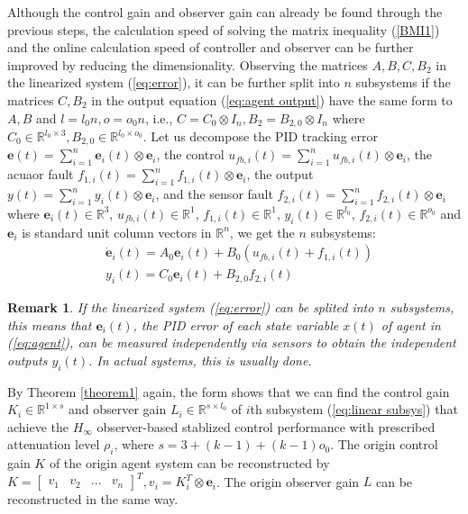 \documentclass{ieeeaccess}
\newtheorem{remark}{Remark}
\begin{document}
Although the control gain and observer gain can already be found through the previous steps, the calculation speed of solving the matrix inequality (\ref{BMI1}) and the online calculation speed of controller and observer can be further improved by reducing the dimensionality. Observing the matrices $A,B,C,B_2$ in the linearized system (\ref{eq:error}), it can be further split into $n$ subsystems if the matrices $C,B_2$ in the output equation (\ref{eq:agent output}) have the same form to $A,B$ and $l=l_0n, o=o_0n$, i.e., $C = C_0\otimes I_n,B_2 = B_{2,0}\otimes I_n$ where $C_0\in\mathbb{R}^{l_0\times 3},B_{2,0}\in\mathbb{R}^{l_0\times o_0}$. Let us decompose the PID tracking error $\pmb{e}(t)=\sum_{i=1}^{n} \pmb{e}_i(t)\otimes\mathbf{e}_i$, the control $u_{fb,i}(t)=\sum_{i=1}^{n} {u}_{fb,i}(t)\otimes\mathbf{e}_i$, the acuaor fault $f_{1,i}(t)=\sum_{i=1}^{n} {f}_{1,i}(t)\otimes\mathbf{e}_i$, the output $y(t)=\sum_{i=1}^{n} {y}_i(t)\otimes\mathbf{e}_i$, and the sensor fault $f_{2,i}(t)=\sum_{i=1}^{n} {f}_{2,i}(t)\otimes\mathbf{e}_i$ where $\pmb{e}_i(t)\in\mathbb{R}^3$, $u_{fb,i}(t)\in\mathbb{R}^1$, $f_{1,i}(t)\in\mathbb{R}^1$, $y_i(t)\in\mathbb{R}^{l_0}$, $f_{2,i}(t)\in\mathbb{R}^{o_0}$ and $\mathbf{e}_i$ is standard unit column vectors in $\mathbb{R}^n$, we get the $n$ subsystems:
\begin{equation} \label{eq:linear subsys}
    \begin{split}
        & \dot{\pmb{e}}_i(t)=A_0\pmb{e}_i(t)+B_0(u_{fb,i}(t)+f_{1,i}(t)) \\
        & {y}_i(t)=C_0\pmb{e}_i(t)+B_{2,0}f_{2,i}(t)   
    \end{split}
\end{equation}
\begin{remark}
    If the linearized system (\ref{eq:error}) can be splited into $n$ subsystems, this means that $\pmb{e}_i(t)$, the PID error of each state variable $x(t)$ of agent in (\ref{eq:agent}), can be measured independently via sensors to obtain the independent outputs $y_i(t)$. In actual systems, this is usually done.
\end{remark}

By Theorem \ref{theorem1} again, the form shows that we can find the control gain $K_i\in\mathbb{R}^{1\times s}$ and observer gain $L_i\in\mathbb{R}^{s\times l_0}$ of $i$th subsystem (\ref{eq:linear subsys}) that achieve the $H_\infty$ observer-based stablized control performance with prescribed attenuation level $\rho_i$, where $s=3+(k-1)+(k-1)o_0$. The origin control gain $K$ of the origin agent system can be reconstructed by $K = \begin{bmatrix}
    \mathit{v}_1 & \mathit{v}_2 & ... & \mathit{v}_n
\end{bmatrix}^T, \mathit{v}_i=K_i^T\otimes\mathbf{e}_i$. The origin observer gain $L$ can be reconstructed in the same way. 
\end{document}
